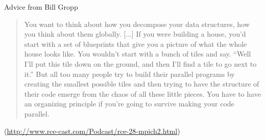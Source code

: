 



\begin{frame}{Advice from Bill Gropp}
  \begin{quote}\large
    You want to think about how you decompose your data structures, how
    you think about them globally.  [...]  If you were building a house,
    you'd start with a set of blueprints that give you a picture of what
    the whole house looks like.  You wouldn't start with a bunch of
    tiles and say. ``Well I'll put this tile down on the ground, and
    then I'll find a tile to go next to it.''  But all too many people
    try to build their parallel programs by creating the smallest
    possible tiles and then trying to have the structure of their code
    emerge from the chaos of all these little pieces.  You have to have
    an organizing principle if you're going to survive making your code
    parallel.
  \end{quote}
  {\small \centering (\url{http://www.rce-cast.com/Podcast/rce-28-mpich2.html})}
\end{frame}
